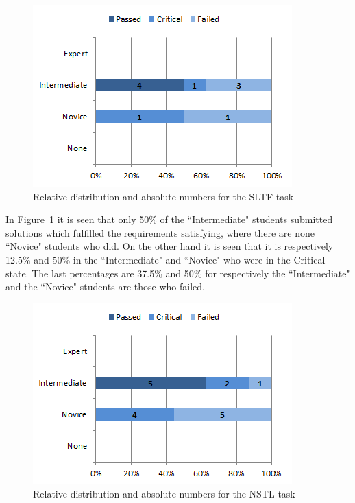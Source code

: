 \documentclass{sig-alternate-05-2015}
\begin{document}
\begin{figure}[!ht]
	\centering
	\includegraphics[width=1\linewidth]{img07}
	\caption{Relative distribution and absolute numbers for the SLTF task}
	\label{fig:SLTF percentage distributions with relative task numbers}
\end{figure}

In Figure~\ref{fig:SLTF percentage distributions with relative task numbers} it is seen that only 50\% of the ``Inter\-mediate" students submitted solutions which fulfilled the requirements satisfying, where there are none ``Novice" students who did. On the other hand it is seen that it is respectively 12.5\% and 50\% in the ``Intermediate" and ``Novice" who were in the Critical state. The last percentages are 37.5\% and 50\% for respectively the ``Intermediate" and the ``Novice" students are those who failed.

\begin{figure}[!ht]
	\centering
	\includegraphics[width=1\linewidth]{img08}
	\caption{Relative distribution and absolute numbers for the NSTL task}
	\label{fig:NSTL percentage distributions with relative task numbers}
\end{figure}
\end{document}
